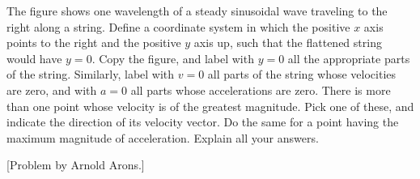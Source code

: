 The figure shows one wavelength of a steady sinusoidal
wave traveling to the right along a string. Define a
coordinate system in which the positive $x$ axis points to
the right and the positive $y$ axis up, such that the
flattened string would have $y=0$. Copy the figure, and
label with $y=0$ all the appropriate parts of the
string. Similarly, label with $v=0$ all parts of the
string whose velocities are zero, and with $a=0$ all
parts whose accelerations are zero. There is more than one
point whose velocity is of the greatest magnitude. Pick one
of these, and indicate the direction of its velocity vector.
Do the same for a point having the maximum magnitude of acceleration.
Explain all your answers.

[Problem by Arnold Arons.]
